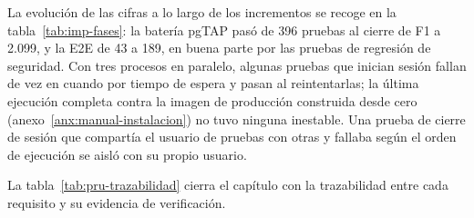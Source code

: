 La evolución de las cifras a lo largo de los incrementos se recoge en la
tabla~\ref{tab:imp-fases}: la batería pgTAP pasó de 396 pruebas al cierre de F1 a
2.099, y la E2E de 43 a 189, en buena parte por las pruebas de regresión de
seguridad. Con tres procesos en paralelo, algunas pruebas que inician sesión
fallan de vez en cuando por tiempo de espera y pasan al reintentarlas; la
última ejecución completa contra la imagen de producción construida desde
cero (anexo~\ref{anx:manual-instalacion}) no tuvo ninguna inestable. Una prueba de cierre de sesión que compartía el usuario de
pruebas con otras y fallaba según el orden de ejecución se aisló con su
propio usuario.

La tabla~\ref{tab:pru-trazabilidad} cierra el capítulo con la trazabilidad
entre cada requisito y su evidencia de verificación.

